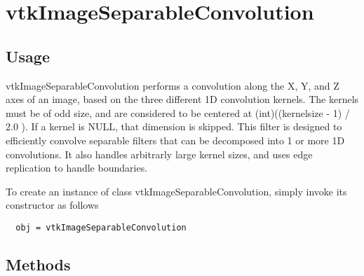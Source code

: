 \section{vtkImageSeparableConvolution}

\subsection{Usage}

 vtkImageSeparableConvolution performs a convolution along the X, Y,
 and Z axes of an image, based on the three different 1D convolution
 kernels.  The kernels must be of odd size, and are considered to be
 centered at (int)((kernelsize - 1) / 2.0 ).  If a kernel is NULL,
 that dimension is skipped.  This filter is designed to efficiently
 convolve separable filters that can be decomposed into 1 or more 1D
 convolutions.  It also handles arbitrarly large kernel sizes, and
 uses edge replication to handle boundaries.

To create an instance of class vtkImageSeparableConvolution, simply
invoke its constructor as follows
\begin{verbatim}
  obj = vtkImageSeparableConvolution
\end{verbatim}
\subsection{Methods}


